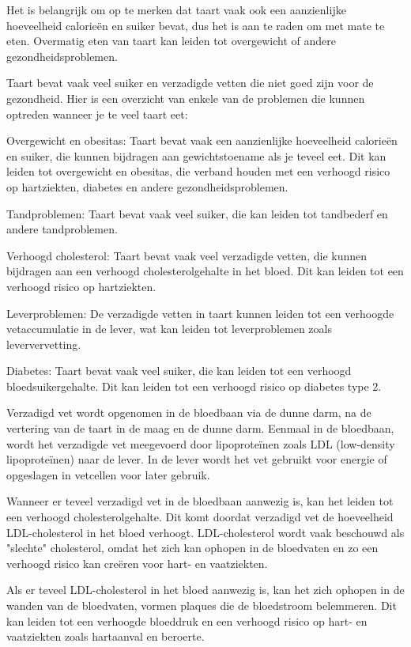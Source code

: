 Het is belangrijk om op te merken dat taart vaak ook een aanzienlijke hoeveelheid calorieën en suiker bevat, dus het is aan te raden om met mate te eten. Overmatig eten van taart kan leiden tot overgewicht of andere gezondheidsproblemen.

Taart bevat vaak veel suiker en verzadigde vetten die niet goed zijn voor de gezondheid. Hier is een overzicht van enkele van de problemen die kunnen optreden wanneer je te veel taart eet:

Overgewicht en obesitas: Taart bevat vaak een aanzienlijke hoeveelheid calorieën en suiker, die kunnen bijdragen aan gewichtstoename als je teveel eet. Dit kan leiden tot overgewicht en obesitas, die verband houden met een verhoogd risico op hartziekten, diabetes en andere gezondheidsproblemen.

Tandproblemen: Taart bevat vaak veel suiker, die kan leiden tot tandbederf en andere tandproblemen.

Verhoogd cholesterol: Taart bevat vaak veel verzadigde vetten, die kunnen bijdragen aan een verhoogd cholesterolgehalte in het bloed. Dit kan leiden tot een verhoogd risico op hartziekten.

Leverproblemen: De verzadigde vetten in taart kunnen leiden tot een verhoogde vetaccumulatie in de lever, wat kan leiden tot leverproblemen zoals leververvetting.

Diabetes: Taart bevat vaak veel suiker, die kan leiden tot een verhoogd bloedsuikergehalte. Dit kan leiden tot een verhoogd risico op diabetes type 2.

Verzadigd vet wordt opgenomen in de bloedbaan via de dunne darm, na de vertering van de taart in de maag en de dunne darm. Eenmaal in de bloedbaan, wordt het verzadigde vet meegevoerd door lipoproteïnen zoals LDL (low-density lipoproteïnen) naar de lever. In de lever wordt het vet gebruikt voor energie of opgeslagen in vetcellen voor later gebruik.

Wanneer er teveel verzadigd vet in de bloedbaan aanwezig is, kan het leiden tot een verhoogd cholesterolgehalte. Dit komt doordat verzadigd vet de hoeveelheid LDL-cholesterol in het bloed verhoogt. LDL-cholesterol wordt vaak beschouwd als "slechte" cholesterol, omdat het zich kan ophopen in de bloedvaten en zo een verhoogd risico kan creëren voor hart- en vaatziekten.

Als er teveel LDL-cholesterol in het bloed aanwezig is, kan het zich ophopen in de wanden van de bloedvaten, vormen plaques die de bloedstroom belemmeren. Dit kan leiden tot een verhoogde bloeddruk en een verhoogd risico op hart- en vaatziekten zoals hartaanval en beroerte.

